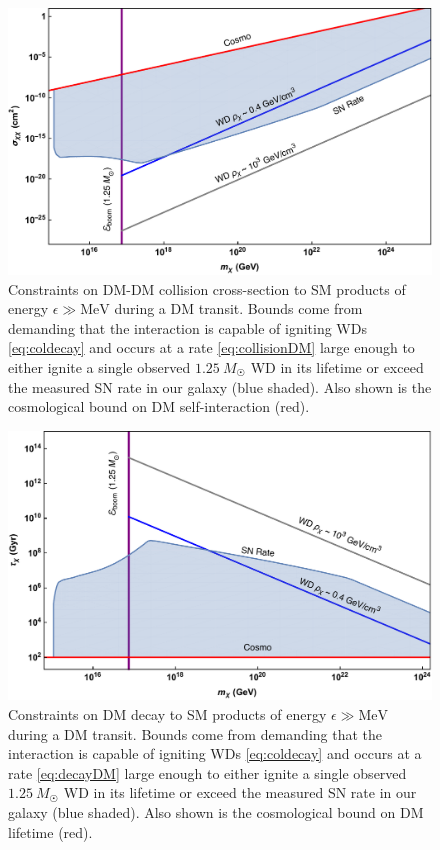 \documentclass[preprintnumbers,amsmath,amssymb,prd,superscriptaddress]{revtex4}
\newcommand{\MeV}{\text{MeV}}
\begin{document}
\begin{figure}
\includegraphics[scale=.35]{collisionobservation.pdf}
\caption{Constraints on DM-DM collision cross-section to SM products of energy $\epsilon \gg \MeV$ during a DM transit. 
Bounds come from demanding that the interaction is capable of igniting WDs \eqref{eq:coldecay} and occurs at a rate \eqref{eq:collisionDM} large enough to either ignite a single observed $1.25~M_{\astrosun}$ WD in its lifetime or exceed the measured SN rate in our galaxy (blue shaded).
Also shown is the cosmological bound on DM self-interaction (red).}
\label{fig:transit-collision}
\end{figure}

\begin{figure}
\includegraphics[scale=.35]{decayobservation.pdf}
\caption{Constraints on DM decay to SM products of energy $\epsilon \gg \MeV$ during a DM transit. 
Bounds come from demanding that the interaction is capable of igniting WDs \eqref{eq:coldecay} and occurs at a rate \eqref{eq:decayDM} large enough to either ignite a single observed $1.25~M_{\astrosun}$ WD in its lifetime or exceed the measured SN rate in our galaxy (blue shaded).
Also shown is the cosmological bound on DM lifetime (red).}
\label{fig:transit-decay}
\end{figure}
\end{document}
